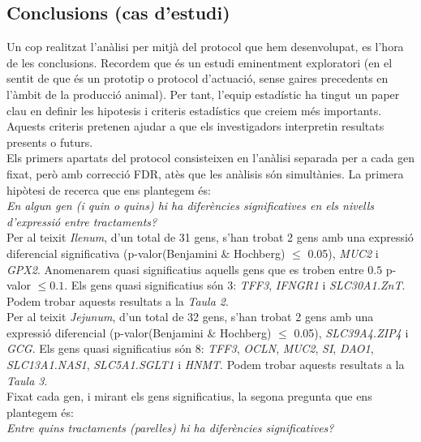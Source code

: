 \documentclass[english]{article}
\begin{document}
\subsection{Conclusions (cas d'estudi)}

Un cop realitzat l'anàlisi per mitjà del protocol que hem desenvolupat, es l'hora de les conclusions. Recordem que és un estudi eminentment exploratori (en el sentit de que és un prototip o protocol d'actuació, sense gaires precedents en l'àmbit de la producció animal). Per tant, l'equip estadístic
ha tingut un paper clau en definir les hipotesis i criteris estadístics que creiem més importants. Aquests criteris pretenen ajudar a que els investigadors interpretin resultats presents o futurs.
\\

Els primers apartats del protocol consisteixen  en l'anàlisi separada per a cada gen fixat, però amb correcció FDR, atès que les anàlisis són simultànies. La primera hipòtesi de recerca que ens plantegem és:
\\

\textit{En algun gen (i quin o quins) hi ha diferències significatives en els nivells d'expressió entre tractaments?}
\\

Per al teixit \textit{Ilenum}, d'un total de 31 gens, s'han trobat 2 gens amb una expressió diferencial significativa (p-valor(Benjamini $\&$ Hochberg) $\leq$ 0.05), \textit{MUC2} i \textit{GPX2}. Anomenarem quasi significatius aquells gens que es troben entre $0.5 $ p-valor $\leq 0.1$. Els gens quasi significatius són 3: \textit{TFF3}, \textit{IFNGR1} i \textit{SLC30A1.ZnT}. Podem trobar aquests resultats a la \textit{Taula 2}.
\\

Per al teixit \textit{Jejunum}, d'un total de 32 gens, s'han trobat 2 gens amb una expressió diferencial (p-valor(Benjamini $\&$ Hochberg) $\leq$ 0.05), \textit{SLC39A4.ZIP4} i \textit{GCG}. Els gens quasi significatius són 8: \textit{TFF3}, \textit{OCLN}, \textit{MUC2}, \textit{SI}, \textit{DAO1}, \textit{SLC13A1.NAS1}, \textit{SLC5A1.SGLT1} i \textit{HNMT}. Podem trobar aquests resultats a la \textit{Taula 3}.\\

Fixat cada gen, i mirant els gens significatius, la segona pregunta que ens plantegem és:
\\

\noindent\textit{Entre quins tractaments (parelles) hi ha diferències significatives?}
\\
\end{document}
